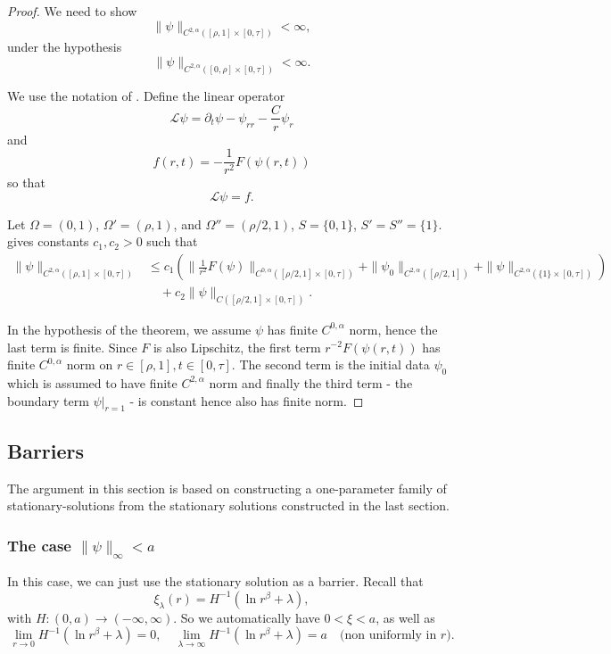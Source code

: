 \documentclass{amsart}
\begin{document}
\begin{proof}
We need to show
\[
\|\psi\|_{C^{2,\alpha}([\rho, 1] \times [0, \tau])} < \infty,
\]
under the hypothesis
\[
\|\psi\|_{C^{2,\alpha}([0, \rho] \times [0, \tau])} < \infty.
\]

We use the notation of \cite[Theorem 10.1]{Ladyzhenskaja:/1967}. Define the linear operator
\[
\mathcal{L} \psi = \partial_t \psi - \psi_{rr} - \frac{C}{r} \psi_r
\]
and
\[
f(r, t) = -\frac{1}{r^2} F(\psi(r, t))
\]
so that
\[
\mathcal{L} \psi = f.
\]

Let \(\Omega = (0, 1)\), \(\Omega' = (\rho, 1)\), and \(\Omega'' = (\rho/2, 1)\), \(S = \{0, 1\}\), \(S' = S'' = \{1\}\). \cite[Theorem 10.1]{Ladyzhenskaja:/1967} gives constants \(c_1, c_2 > 0\) such that
\[
\begin{split}
\|\psi\|_{C^{2,\alpha}([\rho, 1] \times [0, \tau])} &\leq c_1 \left(\|\tfrac{1}{r^2} F(\psi)\|_{C^{0,\alpha}([\rho/2, 1] \times [0, \tau])} + \|\psi_0\|_{C^{2,\alpha}([\rho/2, 1])} + \|\psi\|_{C^{2,\alpha}(\{1\} \times [0, \tau])} \right) \\
&\quad + c_2 \|\psi\|_{C([\rho/2, 1] \times [0, \tau])}.
\end{split}
\]

In the hypothesis of the theorem, we assume \(\psi\) has finite \(C^{0,\alpha}\) norm, hence the last term is finite. Since \(F\) is also Lipschitz, the first term \(r^{-2} F(\psi(r, t))\) has finite \(C^{0,\alpha}\) norm on \(r \in [\rho, 1], t \in [0, \tau]\). The second term is the initial data \(\psi_0\) which is assumed to have finite \(C^{2,\alpha}\) norm and finally the third term - the boundary term \(\psi|_{r=1}\) - is constant hence also has finite norm.
\end{proof}

\subsection{Barriers}
\label{subsec:barriers}

The argument in this section is based on constructing a one-parameter family of stationary-solutions from the stationary solutions constructed in the last section.

\subsubsection{The case \(\|\psi\|_{\infty} < a\)}

In this case, we can just use the stationary solution as a barrier. Recall that
\[
\xi_{\lambda} (r) = H^{-1} (\ln r^{\beta} + \lambda),
\]
with \(H : (0, a) \to (-\infty, \infty)\). So we automatically have \(0 < \xi < a\), as well as
\[
\lim_{r\to 0} H^{-1} (\ln r^{\beta} + \lambda) = 0, \quad \lim_{\lambda\to\infty} H^{-1}(\ln r^{\beta} + \lambda) = a \quad \text{(non uniformly in \(r\))}.
\]
\end{document}
